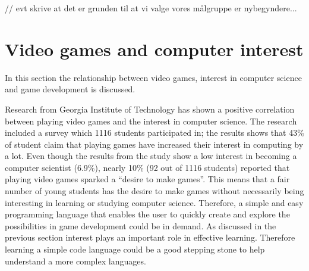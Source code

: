 // evt skrive at det er grunden til at vi valge vores målgruppe er nybegyndere...

\chapter{Video games and computer interest} \label{chap:analysis}
In this section the relationship between video games, interest in computer science and game development is discussed. \newline

Research from Georgia Institute of Technology has shown a positive correlation between playing video games and the interest in computer science. The research included a survey which 1116 students participated in; the results shows that 43\% of student claim that playing games have increased their interest in computing by a lot. 
Even though the results from the study show a low interest in becoming a computer scientist (6.9\%), nearly 10\% (92 out of 1116 students) reported that playing video games sparked a “desire to make games”. 
This means that a fair number of young students has the desire to make games without necessarily being interesting in learning or studying computer science. Therefore, a simple and easy programming language that enables the user to quickly create and explore the possibilities in game development could be in demand.
As discussed in the previous section interest plays an important role in effective learning. Therefore learning a simple code language could be a good stepping stone to help understand a more complex languages.